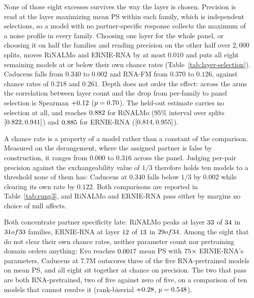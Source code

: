 \documentclass[11pt]{article}
\begin{document}
None of those eight excesses survives the way the layer is chosen. Precision is
read at the layer maximizing mean PS within each family, which is
\chanceRateN{} independent selections, so a model with no partner-specific
response collects the maximum of a noise profile in every family. Choosing one
layer for the whole panel, or choosing it on half the families and reading
precision on the other half over $2{,}000$ splits, moves RiNALMo and ERNIE-RNA
by at most $0.010$ and puts all eight remaining models at or below their own
chance rates (Table~\ref{tab:layer-selection}). Caduceus falls from $0.340$ to
$0.002$ and RNA-FM from $0.370$ to $0.126$, against chance rates of $0.218$ and
$0.261$. Depth does not order the effect: across the \selectionArms{} arms the
correlation between layer count and the drop from per-family to panel selection
is Spearman $+0.12{}$ ($p = 0.70{}$). The held-out
estimate carries no selection at all, and reaches $0.882{}$ for
RiNALMo ($95\%$ interval over splits $[0.822, 0.941]{}$) and
$0.885{}$ for ERNIE-RNA ($[0.814, 0.955]{}$).



A chance rate is a property of a model rather than a constant of the comparison.
Measured on the derangement, where the assigned partner is false by
construction, it ranges from $0.000$ to $0.316$ across the panel. Judging
per-pair precision against the exchangeability value of $1/3$ therefore holds
ten models to a threshold none of them has: Caduceus at $0.340$ falls below
$1/3$ by $0.002$ while clearing its own rate by $0.122$. Both comparisons are
reported in Table~\ref{tab:rung3}, and RiNALMo and ERNIE-RNA pass either by
margins no choice of null affects.

Both concentrate partner specificity late: RiNALMo peaks at layer
$33{}$ of $34{}$ in $31 of 33{}$ families,
ERNIE-RNA at layer $12{}$ of $13{}$ in
$29 of 34{}$. Among the eight that do not clear their own chance
rates, neither parameter count nor pretraining domain orders anything: Evo
reaches $0.0017{}$ mean PS with $75{}\times$ ERNIE-RNA's parameters, Caduceus at
7.7M outscores three of the five RNA-pretrained models on mean PS, and all eight
sit together at chance on precision. The two that pass are both
RNA-pretrained, two of five against zero of five, on a comparison of ten models
that cannot resolve it (rank-biserial $+0.28{}$,
$p = 0.548{}$).
\end{document}
